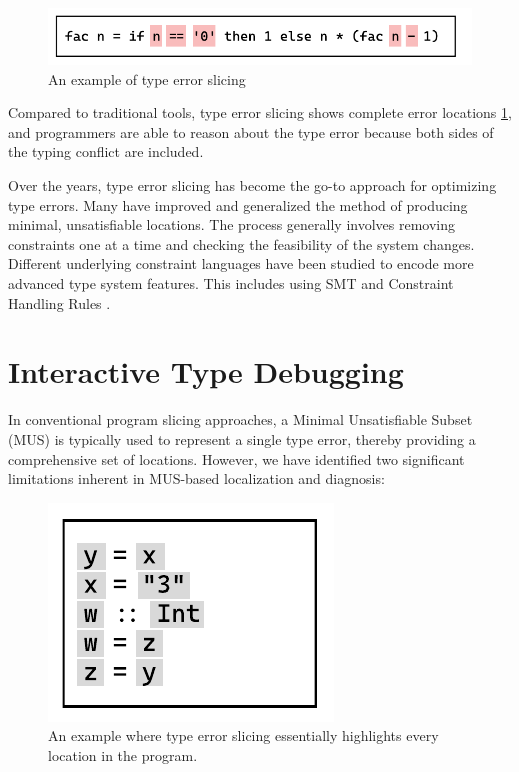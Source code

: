 \begin{figure}[hbt]
  \includegraphics[width=0.5\linewidth]{TypeErrorSlicing.pdf}
  \caption{
    \label{fig:type-error-slicing}
      An example of type error slicing}
\end{figure}

Compared to traditional tools, type error slicing shows complete error locations \ref{fig:type-error-slicing}, and programmers are able to reason about the type error because both sides of the typing conflict are included. 

Over the years, type error slicing has become the go-to approach for optimizing type errors. Many have improved and generalized the method of producing minimal, unsatisfiable locations. The process generally involves removing constraints one at a time and checking the feasibility of the system changes. Different underlying constraint languages have been studied to encode more advanced type system features. This includes using SMT \cite{Pavlinovic2015-ke} and Constraint Handling Rules \cite{Stuckey2003-pz}. 



\section{Interactive Type Debugging}

In conventional program slicing approaches, a Minimal Unsatisfiable Subset (MUS) is typically used to represent a single type error, thereby providing a comprehensive set of locations. However, we have identified two significant limitations inherent in MUS-based localization and diagnosis:

\begin{figure}[hbt]
  \includegraphics[width=0.5\linewidth]{SlicingCounterExample}
  \caption{
    \label{fig:slicing-counter-example}
      An example where type error slicing essentially highlights every location in the program.}
\end{figure}

